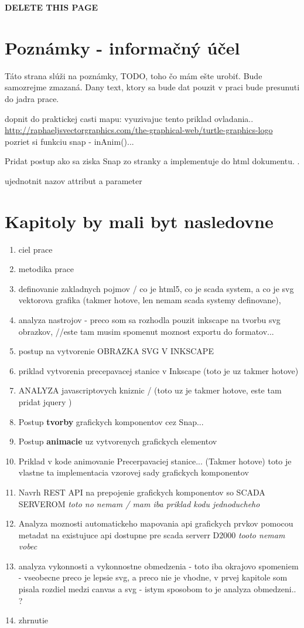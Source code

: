 {\Huge\textbf{ DELETE THIS PAGE}}
\section{Poznámky - informačný účel}
Táto strana slúži na poznámky, TODO, toho čo mám ešte urobiť. 
Bude samozrejme zmazaná.  
Dany text, ktory sa bude dat pouzit v praci bude presunuti do jadra prace. 

dopnit do praktickej casti mapu: vyuzivajuc tento priklad ovladania.. \url{http://raphaeljsvectorgraphics.com/the-graphical-web/turtle-graphics-logo}
pozriet si funkciu snap - inAnim()...


Pridat postup ako sa ziska Snap zo stranky a implementuje do html dokumentu. .

ujednotnit nazov attribut a parameter

\section{Kapitoly by mali byt nasledovne}
\begin{enumerate}
	\item ciel prace 
	\item metodika prace
	\item definovanie zakladnych pojmov / co je html5, co je scada system, a co je svg vektorova grafika (takmer hotove, len nemam scada systemy definovane), 
	\item analyza nastrojov - preco som sa rozhodla pouzit inkscape na tvorbu svg obrazkov, //este tam musim spomenut moznost exportu do formatov... 
	\item postup na vytvorenie OBRAZKA SVG V INKSCAPE
	\item priklad vytvorenia precepavacej stanice v Inkscape (toto je uz takmer hotove)
	\item ANALYZA javascriptovych kniznic / (toto uz je takmer hotove, este tam pridat jquery )
	\item Postup \textbf{tvorby} grafickych komponentov cez Snap... 
	\item Postup \textbf{animacie} uz vytvorenych grafickych elementov 
	\item Priklad v kode animovanie Precerpavaciej stanice... (Takmer hotove) toto je vlastne ta implementacia vzorovej sady grafickych komponentov
	\item Navrh REST API na prepojenie grafickych komponentov so SCADA SERVEROM  \textit{toto no nemam / mam iba priklad kodu jednoducheho }
	\item Analyza moznosti automatickeho mapovania api grafickych prvkov pomocou metadat na existujuce api dostupne pre scada serverr D2000 \textit{tooto nemam vobec}
	\item analyza vykonnosti a vykonnostne obmedzenia - toto iba okrajovo spomeniem - vseobecne preco je lepsie svg, a preco nie je vhodne, v prvej kapitole som pisala rozdiel medzi canvas a svg - istym sposobom to je analyza obmedzeni.. ?
	\item zhrnutie
	
\end{enumerate}


